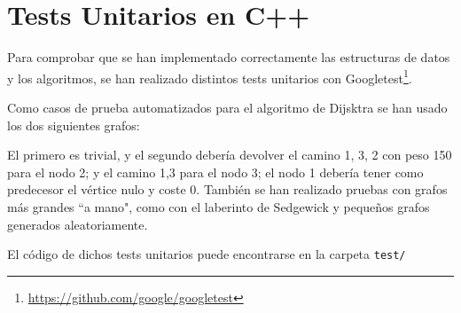 \documentclass{article}
\begin{document}
\section{Tests Unitarios en C++}
Para comprobar que se han implementado correctamente las estructuras de datos y los algoritmos, se han realizado distintos tests unitarios con Googletest\footnote{\url{https://github.com/google/googletest}}.

Como casos de prueba automatizados para el algoritmo de Dijsktra se han usado los dos siguientes grafos:

\vspace*{1em}
\noindent\begin{minipage}{.45\textwidth}
\centering
{}
\end{minipage} %
\begin{minipage}{.45\textwidth}
\centering
{}
\end{minipage}

El primero es trivial, y el segundo debería devolver el camino 1, 3, 2 con peso 150 para el nodo 2; y el camino 1,3 para el nodo 3; el nodo 1 debería tener como predecesor el vértice nulo y coste 0. También se han realizado pruebas con grafos más grandes ``a mano", como con el laberinto de Sedgewick \cite{SedgewickLabyrinth} y pequeños grafos generados aleatoriamente.

El código de dichos tests unitarios puede encontrarse en la carpeta \texttt{test/}
\end{document}

